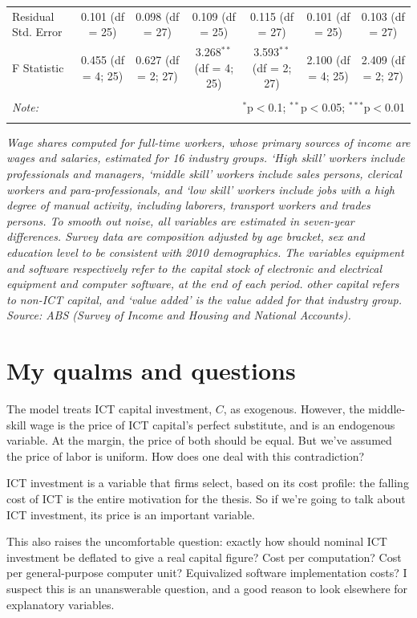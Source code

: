 \documentclass[a4paper]{article}
\begin{document}
\begin{table}
\begin{center}
\begin{tabular}{@{\extracolsep{5pt}}lcccccc}
Residual Std. Error & 0.101 (df = 25) & 0.098 (df = 27) & 0.109 (df = 25) & 0.115 (df = 27) & 0.101 (df = 25) & 0.103 (df = 27) \\ 
F Statistic & 0.455 (df = 4; 25) & 0.627 (df = 2; 27) & 3.268$^{**}$ (df = 4; 25) & 3.593$^{**}$ (df = 2; 27) & 2.100 (df = 4; 25) & 2.409 (df = 2; 27) \\ 
\hline 
\hline \\[-1.8ex] 
\textit{Note:}  & \multicolumn{6}{r}{$^{*}$p$<$0.1; $^{**}$p$<$0.05; $^{***}$p$<$0.01} \\ 
\normalsize 
\end{tabular} 
\end{center}
{\em Wage shares computed for full-time workers, whose primary sources of income are wages and salaries, estimated for 16 industry groups. `High skill' workers include professionals and managers, `middle skill' workers include sales persons, clerical workers and para-professionals, and `low skill' workers include jobs with a high degree of manual activity, including laborers, transport workers and trades persons. To smooth out noise, all variables are estimated in seven-year differences. Survey data are composition adjusted by age bracket, sex and education level to be consistent with 2010 demographics. The variables {\em equipment} and {\em software} respectively refer to the capital stock of electronic and electrical equipment and computer software, at the end of each period. {\em other capital} refers to non-ICT capital, and {\em `value added'} is the value added for that industry group. Source: ABS (Survey of Income and Housing and National Accounts).}
\end{table} 

\section{My qualms and questions}\label{qualms}

The model treats ICT capital investment, $C$, as exogenous. However, the middle-skill wage is the price of ICT capital's perfect substitute, and is an endogenous variable. At the margin, the price of both should be equal. But we've assumed the price of labor is uniform. How does one deal with this contradiction? 

ICT investment is a variable that firms select, based on its cost profile: the falling cost of ICT is the entire motivation for the thesis. So if we're going to talk about ICT investment, its price is an important variable.

This also raises the uncomfortable question: exactly how should nominal ICT investment be deflated to give a real capital figure? Cost per computation? Cost per general-purpose computer unit? Equivalized software implementation costs? I suspect this is an unanswerable question, and a good reason to look elsewhere for explanatory variables.

\printbibliography
\end{document}
